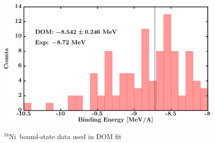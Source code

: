 \documentclass[twocolumn,secnumarabic,amssymb, nobibnotes, aps, prl,
superscriptaddress, nobalancelastpage]{revtex4}
\newcommand{\niEight}{\ensuremath{^{58}}N\lowercase{i}}
\begin{document}
\begin{figure}[!htb]
\begin{minipage}{0.4\linewidth}
        \label{DOM_ni58_RMSRadius}
    \end{minipage}
    \begin{minipage}{0.4\linewidth}
        \centering
        \includegraphics[width=\linewidth]{figures/ni58_BE.png}
        \label{DOM_ni58_BE}
    \end{minipage}
    \caption{\niEight\ bound-state data used in DOM fit}
    \label{DOM_ni58_structural}
\end{figure}
\end{document}
